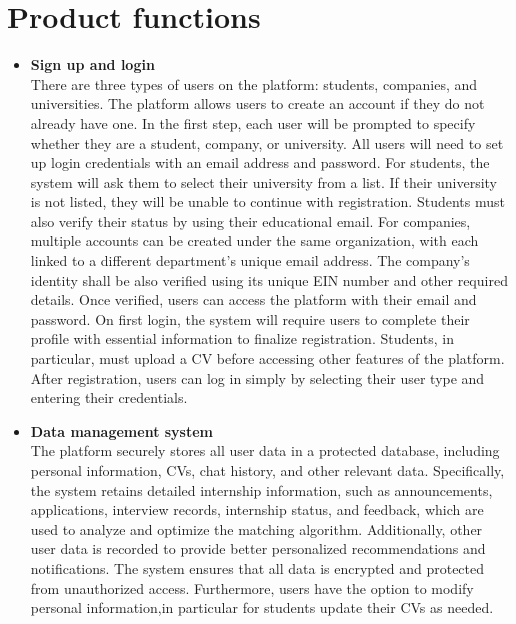 \section{Product functions}\label{subsec:product_functions}
\begin{itemize}[label={ }]
    \item \textcolor{bluepoli}{\textbf{Sign up and login}} 
    \\There are three types of users on the platform: students, companies, and universities. The platform allows users to create an account if they do not already 
    have one. In the first step, each user will be prompted to specify whether they are a student, company, or university. All users will need to set up login
    credentials with an email address and password.
    For students, the system will ask them to select their university from a list. If their university is not listed, they will be unable to continue with
    registration. Students must also verify their status by using their educational email.
    For companies, multiple accounts can be created under the same organization, with each linked to a different department’s unique email address. The 
    company’s identity shall be also verified using its unique EIN number and other required details.
    Once verified, users can access the platform with their email and password. On first login, the system will require users to complete their profile with
    essential information to finalize registration. Students, in particular, must upload a CV before accessing other features of the platform.
    After registration, users can log in simply by selecting their user type and entering their credentials.

    \item \textcolor{bluepoli}{\textbf{Data management system}}
    \\ The platform securely stores all user data in a protected database, including personal information, CVs, chat history, and other relevant data. 
    Specifically, the system retains detailed internship information, such as announcements, applications, interview records, internship status, and 
    feedback, which are used to analyze and optimize the matching algorithm. Additionally, other user data is recorded to provide better personalized 
    recommendations and notifications. The system ensures that all data is encrypted and protected from unauthorized access.
    Furthermore, users have the option to modify personal information,in particular for students update their CVs as needed.


\end{itemize}
